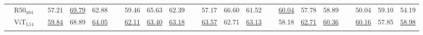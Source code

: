 \begin{table}[bp]
\begin{tabularx}{\textwidth}{cl c YYY c YYY c YYY c YYY c YYY}

\midrule





\parbox[t]{1mm}{}
&{R50$_{\text{x64}}$} &  & 
57.21 & \underline{69.79} & 62.88  & ~ &
59.46 & 65.63 & 62.39  & ~ &
57.17 & 66.60 & 61.52  & ~ &
\underline{60.04} & 57.78 & 58.89  & ~ &
50.04 & 59.10 & 54.19  \\



&{ViT$_{\text{L14}}$} &  & 
\underline{59.84} & 68.89 & \underline{64.05}  & ~ &
\underline{62.11} & \underline{63.40} & \underline{63.18}  & ~ &
\underline{63.57} & 62.71 & \underline{63.13}  & ~ &
58.18 & \underline{62.71} & \underline{60.36}  & ~ &
\underline{60.16} & 57.85 & \underline{58.98}  \\

 


\end{tabularx}
\end{table}
